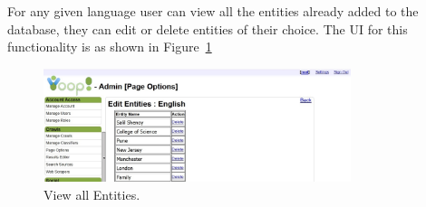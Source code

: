 For any given language user can view all the entities already added to the database, they can edit or delete entities of their choice. The UI for this functionality is as shown in Figure~\ref{fig:viewallentities}

\begin{figure}[htb]
\centering
\includegraphics[width=0.8\textwidth]{images/viewallentities.jpg}
\caption{View all Entities.} 
\label{fig:viewallentities}
\end{figure}
